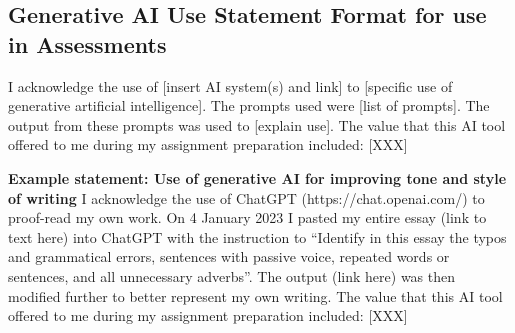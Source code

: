 \documentclass[]{document-classes/mscthesis}
\affiliation{
  \institution{\thesisinstitution}
  \city{\thesiscity}
  \country{\thesiscountry}
}
\begin{document}
\begin{center}

\section*{Generative AI Use Statement Format for use in Assessments}
I acknowledge the use of [insert AI system(s) and link] to [specific use of generative
artificial intelligence]. The prompts used were [list of prompts]. The output from
these prompts was used to [explain use].
The value that this AI tool offered to me during my assignment preparation included:
[XXX]



\noindent\textbf{Example statement: Use of generative AI for improving tone and style of writing}
I acknowledge the use of ChatGPT (https://chat.openai.com/) to proof-read my own
work. On 4 January 2023 I pasted my entire essay (link to text here) into ChatGPT
with the instruction to “Identify in this essay the typos and grammatical errors,
sentences with passive voice, repeated words or sentences, and all unnecessary
adverbs”. The output (link here) was then modified further to better represent my
own writing.
The value that this AI tool offered to me during my assignment preparation included:
[XXX]

\end{center}
\end{document}

